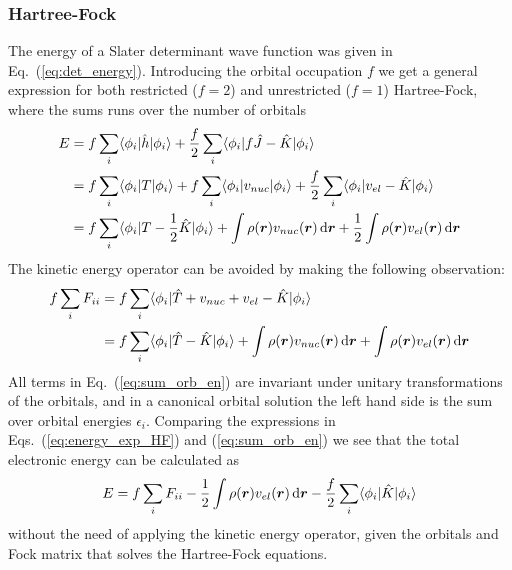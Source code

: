 \subsubsection{Hartree-Fock}
The energy of a Slater determinant wave function was given in Eq.~(\ref{eq:det_energy}).
Introducing the orbital occupation $f$ we get a general expression for
both restricted ($f=2$) and unrestricted ($f=1$) Hartree-Fock, where the sums runs over the
number of orbitals
\begin{align}
    E	&= f \sum_i \langle \phi_i|\hat{h}|\phi_i \rangle
	    + \frac{f}{2} \sum_i \langle \phi_i|f\hat{J} - \hat{K}|\phi_i \rangle\\
	&= f \sum_i \langle \phi_i|T|\phi_i \rangle
	    + f \sum_i \langle \phi_i|v_{nuc}|\phi_i \rangle
	    + \frac{f}{2} \sum_i \langle \phi_i|v_{el} - \hat{K}|\phi_i \rangle \\
	&= f \sum_i \langle \phi_i|T - \frac{1}{2}\hat{K}|\phi_i \rangle
	    + \int \rho(\boldsymbol r)v_{nuc}(\boldsymbol r) \,\mathrm{d}\boldsymbol r
	    + \frac{1}{2} \int \rho(\boldsymbol r)v_{el}(\boldsymbol r) \,\mathrm{d}\boldsymbol r
\end{align}
The kinetic energy operator can be avoided by making the following observation:
\begin{align}
    \label{eq:sum_orb_en}
    f \sum_i F_{ii} &= f \sum_i \langle\phi_i|\hat{T} + v_{nuc} + v_{el} - \hat{K}|\phi_i\rangle\\
		    &= f \sum_i \langle\phi_i|\hat{T} - \hat{K}|\phi_i\rangle
		     + \int \rho(\boldsymbol r)v_{nuc}(\boldsymbol r) \,\mathrm{d}\boldsymbol r
		     + \int \rho(\boldsymbol r)v_{el}(\boldsymbol r) \,\mathrm{d}\boldsymbol r
\end{align}
All terms in Eq.~(\ref{eq:sum_orb_en}) are invariant under unitary transformations of the orbitals,
and in a canonical orbital solution the left hand side is the sum over orbital energies $\epsilon_i$.
Comparing the expressions in Eqs.~(\ref{eq:energy_exp_HF}) and (\ref{eq:sum_orb_en}) we see that
the total electronic energy can be calculated as
\begin{equation}
    E = f \sum_i F_{ii} - \frac{1}{2} \int \rho(\boldsymbol r)v_{el}(\boldsymbol r) \,\mathrm{d}\boldsymbol r
	- \frac{f}{2} \sum_i \langle\phi_i|\hat{K}|\phi_i\rangle
\end{equation}
without the need of applying the kinetic energy operator, given the orbitals and Fock matrix that
solves the Hartree-Fock equations.

